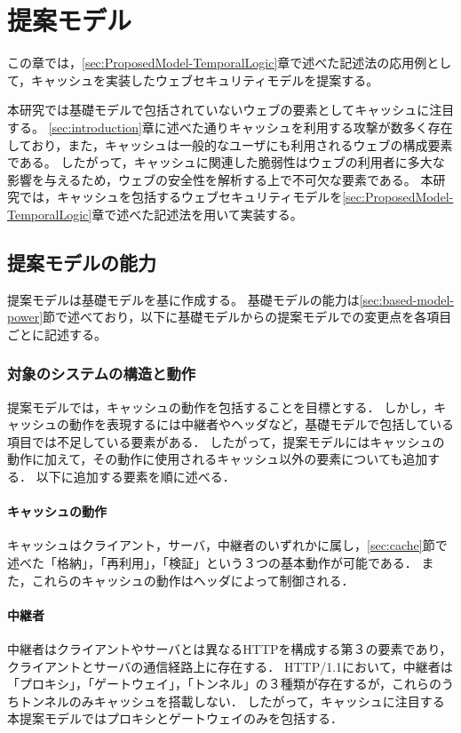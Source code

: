 \documentclass[12pt,a4paper]{jbook}
\begin{document}
\newpage

\chapter{提案モデル}
この章では，\ref{sec:ProposedModel-TemporalLogic}章で述べた記述法の応用例として，キャッシュを実装したウェブセキュリティモデルを提案する。

本研究では基礎モデルで包括されていないウェブの要素としてキャッシュに注目する。
\ref{sec:introduction}章に述べた通りキャッシュを利用する攻撃が数多く存在しており，また，キャッシュは一般的なユーザにも利用されるウェブの構成要素である。
したがって，キャッシュに関連した脆弱性はウェブの利用者に多大な影響を与えるため，ウェブの安全性を解析する上で不可欠な要素である。
本研究では，キャッシュを包括するウェブセキュリティモデルを\ref{sec:ProposedModel-TemporalLogic}章で述べた記述法を用いて実装する。

\section{提案モデルの能力}
\label{sec:ProposedModel-Power}
提案モデルは基礎モデルを基に作成する。
基礎モデルの能力は\ref{sec:based-model-power}節で述べており，以下に基礎モデルからの提案モデルでの変更点を各項目ごとに記述する。

\subsection{対象のシステムの構造と動作}
提案モデルでは，キャッシュの動作を包括することを目標とする．
しかし，キャッシュの動作を表現するには中継者やヘッダなど，基礎モデルで包括している項目では不足している要素がある．
したがって，提案モデルにはキャッシュの動作に加えて，その動作に使用されるキャッシュ以外の要素についても追加する．
以下に追加する要素を順に述べる．

\subsubsection{キャッシュの動作}
キャッシュはクライアント，サーバ，中継者のいずれかに属し，\ref{sec:cache}節で述べた「格納」，「再利用」，「検証」という３つの基本動作が可能である．
また，これらのキャッシュの動作はヘッダによって制御される．

\subsubsection{中継者}
中継者はクライアントやサーバとは異なるHTTPを構成する第３の要素であり，クライアントとサーバの通信経路上に存在する．
HTTP/1.1において，中継者は「プロキシ」，「ゲートウェイ」，「トンネル」の３種類が存在するが，これらのうちトンネルのみキャッシュを搭載しない．
したがって，キャッシュに注目する本提案モデルではプロキシとゲートウェイのみを包括する．
\end{document}
